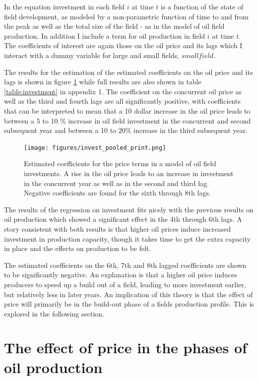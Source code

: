 \documentclass[11pt]{article}
\begin{document}
In the equation investment in each field $i$ at time $t$ is a function of the state of field development, as modeled by a non-parametric function of time to and from the peak as well as the total size of the field - as in the model of oil field production.  In addition I include a term for oil production in field $i$ at time $t$.  The coefficients of interest are again those on the oil price and its lags which I interact with a dummy variable for large and small fields, $smallfield$.

The results for the estimation of the estimated coefficients on the oil price and its lags is shown in figure \ref{gam_price_invest_box} while full results are also shown in table \ref{table:investment} in appendix 1.  The coefficient on the concurrent oil price as well as the third and fourth lags are all significantly positive, with coefficients that can be interpreted to mean that a 10 dollar increase in the oil price leads to between a 5 to 10 \% increase in oil field investment in the concurrent and second subsequent year and between a 10 to 20\% increase in the third subsequent year.  

\begin{figure}
	\texttt{[image: figures/invest\_pooled\_print.png]}
	\caption{Estimated coefficients for the price terms in a model of oil field investments.  A rise in the oil price leads to an increase in investment in the concurrent year as well as in the second and third lag. Negative coefficients are found for the sixth through 8th lags.}
	\label{gam_price_invest_box}
\end{figure}

The results of the regression on investment fits nicely with the previous results on oil production which showed a significant effect in the 4th through 6th lags.  A story consistent with both results is that higher oil prices induce increased investment in production capacity, though it takes time to get the extra capacity in place and the effects on production to be felt.

The estimated coefficients on the 6th, 7th and 8th lagged coefficients are shown to be significantly negative. An explanation is that a higher oil price induces producers to speed up a build out of a field, leading to more investment earlier, but relatively less in later years.  An implication of this theory is that the effect of price will primarily be in the build-out phase of a fields production profile.  This is explored in the following section.

\section{The effect of price in the phases of oil production}
\end{document}
